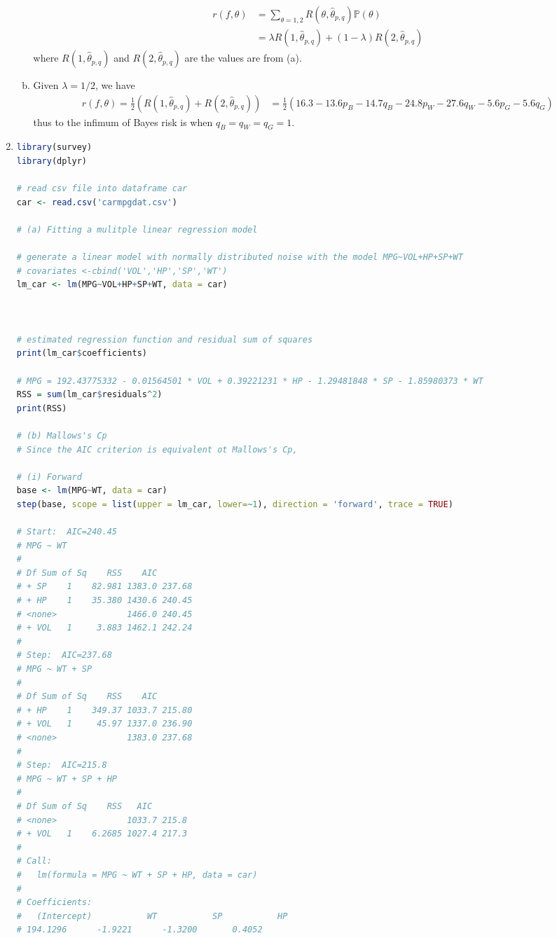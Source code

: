 \documentclass[a4paper,10pt]{article}
\theoremstyle{definition}
\begin{document}
\begin{enumerate}
\begin{enumerate}[(a)]
\begin{align*}
r(f,\theta) &= \sum_{\theta=1,2}R(\theta,\hat{\theta}_{p,q})\mathbb{P}(\theta)\\
&= \lambda R(1,\hat{\theta}_{p,q})+ (1-\lambda)R(2,\hat{\theta}_{p,q})
\end{align*}
where $R(1,\hat{\theta}_{p,q})$ and $R(2,\hat{\theta}_{p,q})$ are the values are from (a).
\item Given $\lambda = 1/2$, we have
\begin{align*}
r(f,\theta)=\frac{1}{2} \left(R(1,\hat{\theta}_{p,q})+ R(2,\hat{\theta}_{p,q})\right) &=\frac{1}{2}\left(16.3-13.6p_B-14.7q_B-24.8p_W-27.6q_W-5.6p_G-5.6q_G\right)
\end{align*}
thus to the infimum of Bayes risk is when $q_B = q_W = q_G =1$.
\end{enumerate}

\newpage
\item


\begin{lstlisting}[language=R,commentstyle=\fontseries{lc}\color{gray}]
library(survey)
library(dplyr)

# read csv file into dataframe car
car <- read.csv('carmpgdat.csv')

# (a) Fitting a mulitple linear regression model

# generate a linear model with normally distributed noise with the model MPG~VOL+HP+SP+WT
# covariates <-cbind('VOL','HP','SP','WT')
lm_car <- lm(MPG~VOL+HP+SP+WT, data = car)



# estimated regression function and residual sum of squares
print(lm_car$coefficients)

# MPG = 192.43775332 - 0.01564501 * VOL + 0.39221231 * HP - 1.29481848 * SP - 1.85980373 * WT
RSS = sum(lm_car$residuals^2)
print(RSS)

# (b) Mallows's Cp
# Since the AIC criterion is equivalent ot Mallows's Cp, 

# (i) Forward
base <- lm(MPG~WT, data = car)
step(base, scope = list(upper = lm_car, lower=~1), direction = 'forward', trace = TRUE)

# Start:  AIC=240.45
# MPG ~ WT
# 
# Df Sum of Sq    RSS    AIC
# + SP    1    82.981 1383.0 237.68
# + HP    1    35.380 1430.6 240.45
# <none>              1466.0 240.45
# + VOL   1     3.883 1462.1 242.24
# 
# Step:  AIC=237.68
# MPG ~ WT + SP
# 
# Df Sum of Sq    RSS    AIC
# + HP    1    349.37 1033.7 215.80
# + VOL   1     45.97 1337.0 236.90
# <none>              1383.0 237.68
# 
# Step:  AIC=215.8
# MPG ~ WT + SP + HP
# 
# Df Sum of Sq    RSS   AIC
# <none>              1033.7 215.8
# + VOL   1    6.2685 1027.4 217.3
# 
# Call:
#   lm(formula = MPG ~ WT + SP + HP, data = car)
# 
# Coefficients:
#   (Intercept)           WT           SP           HP  
# 194.1296      -1.9221      -1.3200       0.4052


\end{lstlisting}
\end{enumerate}
\end{document}
